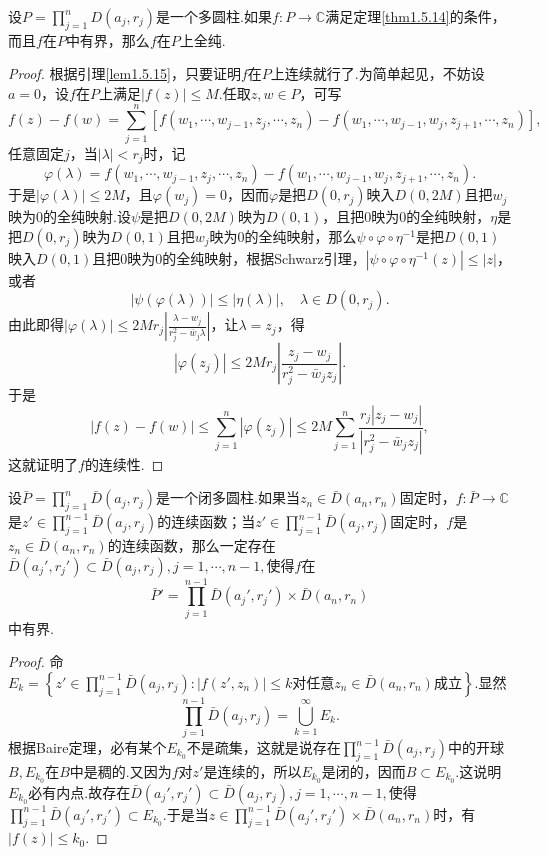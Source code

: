 \begin{lemma}\label{lem1.5.16}
	设$P=\prod\limits_{j=1}^{n}D(a_j,r_j)$是一个多圆柱.如果$f\colon P\to\mathbb{C}$满足定理\ref{thm1.5.14}的条件，而且$f$在$P$中有界，那么$f$在$P$上全纯.
\end{lemma}
\begin{proof}
	根据引理\ref{lem1.5.15}，只要证明$f$在$P$上连续就行了.为简单起见，不妨设$a=0$，设$f$在$P$上满足$|f(z)|\le M$.任取$z,w\in P$，可写
\[
		f(z)-f(w)
		=\sum_{j=1}^{n}[f(w_1,\cdots,w_{j-1},z_j,\cdots,z_n)-f(w_1,\cdots,w_{j-1},w_j,z_{j+1},\cdots,z_n)],
\]
任意固定$j$，当$|\lambda|<r_j$时，记
\[
	\varphi(\lambda)
	=f(w_1,\cdots,w_{j-1},z_j,\cdots,z_n)-f(w_1,\cdots,w_{j-1},w_j,z_{j+1},\cdots,z_n).
\]
于是$|\varphi(\lambda)|\le 2M$，且$\varphi(w_j)=0$，因而$\varphi$是把$D(0,r_j)$映入$D(0,2M)$且把$w_j$映为$0$的全纯映射.设$\psi$是把$D(0,2M)$映为$D(0,1)$，且把$0$映为$0$的全纯映射，$\eta$是把$D(0,r_j)$映为$D(0,1)$且把$w_j$映为$0$的全纯映射，那么$\psi\circ\varphi\circ\eta^{-1}$是把$D(0,1)$映入$D(0,1)$且把$0$映为$0$的全纯映射，根据Schwarz引理，$|\psi\circ\varphi\circ\eta^{-1}(z)|\le|z|$，或者
\[|\psi(\varphi(\lambda))|\le|\eta(\lambda)|,\quad\lambda\in D(0,r_j).\]
由此即得\quad $|\varphi(\lambda)|\le 2Mr_j\left|\frac{\lambda-w_j}{r_j^2-\bar{w}_j \lambda}\right|$，让$\lambda=z_j$，得
\[|\varphi(z_j)|\le 2Mr_j\left|\frac{z_j-w_j}{r_j^2-\bar{w}_jz_j}\right|.\]
于是
\[|f(z)-f(w)|\le\sum_{j=1}^{n}|\varphi(z_j)|\le 2M\sum_{j=1}^{n}\frac{r_j|z_j-w_j|}{|r_j^2-\bar{w}_jz_j|},\]
这就证明了$f$的连续性.
\end{proof}
\begin{lemma}\label{lem1.5.17}
	设$\bar{P}=\prod\limits_{j=1}^{n}\bar{D}(a_j,r_j)$是一个闭多圆柱.如果当$z_n\in\bar{D}(a_n,r_n)$固定时，$f\colon \bar{P}\to\mathbb{C}$是$z'\in\prod\limits_{j=1}^{n-1} \bar{D}(a_j,r_j)$的连续函数；当$z'\in\prod\limits_{j=1}^{n-1} \bar{D}(a_j,r_j)$固定时，$f$是$z_n\in\bar{D}(a_n,r_n)$的连续函数，那么一定存在$\bar{D}(a_j',r_j')\subset\bar{D}(a_j,r_j),j=1,\cdots,n-1,$使得$f$在
	\[\bar{P}'=\prod_{j=1}^{n-1}\bar{D}(a_j',r_j')\times\bar{D}(a_n,r_n)\]
	中有界.
\end{lemma}
\begin{proof}
	命$E_k=\left\{z'\in\prod\limits_{j=1}^{n-1}\bar{D}(a_j,r_j)\colon|f(z',z_n)|\le k\text{对任意}z_n\in\bar{D}(a_n,r_n)\text{成立}\right\}$.显然
	\[\prod_{j=1}^{n-1}\bar{D}(a_j,r_j)=\bigcup_{k=1}^\infty E_k.\]
	根据Baire定理，必有某个$E_{k_0}$不是疏集，这就是说存在$\prod\limits_{j=1}^{n-1}\bar{D}(a_j,r_j)$中的开球$B,E_{k_0}$在$B$中是稠的.又因为$f$对$z'$是连续的，所以$E_{k_0}$是闭的，因而$B\subset E_{k_0}$.这说明$E_{k_0}$必有内点.故存在$\bar{D}(a_j',r_j')\subset\bar{D}(a_j,r_j),j=1,\cdots,n-1,$使得$\prod\limits_{j=1}^{n-1}\bar{D}(a_j',r_j')\subset E_{k_0}$.于是当$z\in\prod\limits_{j=1}^{n-1}\bar{D}(a_j',r_j')\times\bar{D}(a_n,r_n)$时，有$|f(z)|\le k_0$.
\end{proof}
